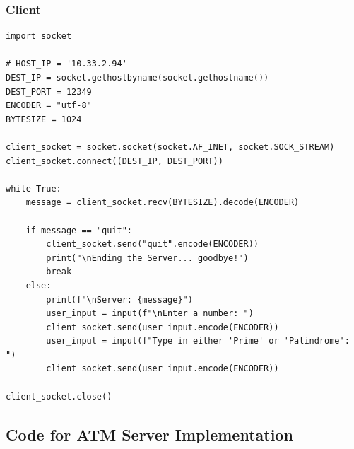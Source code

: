 \documentclass[11pt]{article}
\begin{document}
\subsubsection*{Client}
\begin{verbatim}
import socket

# HOST_IP = '10.33.2.94'
DEST_IP = socket.gethostbyname(socket.gethostname())
DEST_PORT = 12349
ENCODER = "utf-8"
BYTESIZE = 1024

client_socket = socket.socket(socket.AF_INET, socket.SOCK_STREAM)
client_socket.connect((DEST_IP, DEST_PORT))

while True:
    message = client_socket.recv(BYTESIZE).decode(ENCODER)

    if message == "quit":
        client_socket.send("quit".encode(ENCODER))
        print("\nEnding the Server... goodbye!")
        break
    else:
        print(f"\nServer: {message}")
        user_input = input(f"\nEnter a number: ")
        client_socket.send(user_input.encode(ENCODER))
        user_input = input(f"Type in either 'Prime' or 'Palindrome': ")
        client_socket.send(user_input.encode(ENCODER))

client_socket.close()
\end{verbatim}

\subsection*{Code for ATM Server Implementation}
\end{document}
